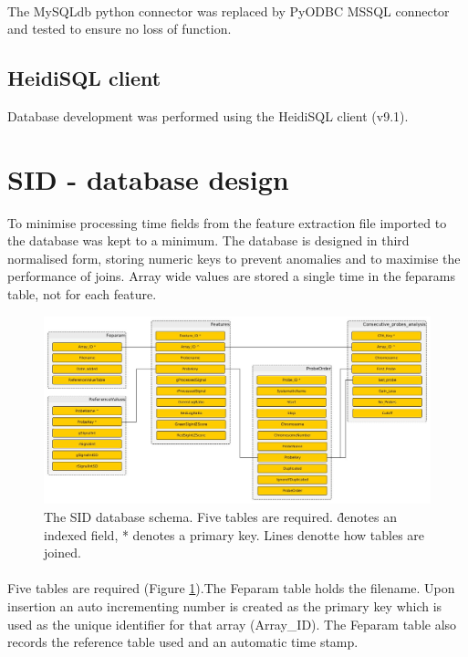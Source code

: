\paragraph*{}
The MySQLdb python connector was replaced by PyODBC MSSQL connector \cite{pyodbc_mkleehammer/pyodbc_????} and tested to ensure no loss of function.

\subsection{HeidiSQL client}
Database development was performed using the HeidiSQL client (v9.1)\cite{heidisql_heidisql_2016}.

\section{SID - database design}
To minimise processing time fields from the feature extraction file imported to the database was kept to a minimum. The database is designed in third normalised form, storing numeric keys to prevent anomalies and to maximise the performance of joins. Array wide values are stored a single time in the feparams table, not for each feature.
\begin{figure}
\centering
\includegraphics[width=1\linewidth]{./Figures/SIDdbschema-simple}
\caption{The SID database schema. Five tables are required. \^ denotes an indexed field, * denotes a primary key. Lines denotte how tables are joined.}
\label{fig:SIDdbschema-simple}
\end{figure}

\paragraph*{}
Five tables are required (Figure \ref{fig:SIDdbschema-simple}).The Feparam table holds the filename. Upon insertion an auto incrementing number is created as the primary key which is used as the unique identifier for that array (Array\_ID). The Feparam table also records the reference table used  and an automatic time stamp. 
